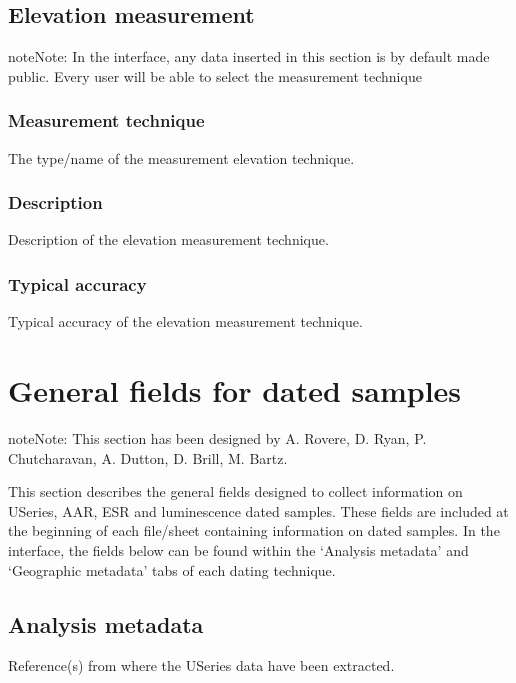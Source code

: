 \documentclass[letterpaper,10pt,english]{sphinxmanual}
\begin{document}
\section{Elevation measurement}
\label{\detokenize{Metadata:elevation-measurement}}
\begin{sphinxadmonition}{note}{Note:}
In the interface, any data inserted in this section is by default made public. Every user will be able to select the measurement technique
\end{sphinxadmonition}


\subsection{Measurement technique}
\label{\detokenize{Metadata:measurement-technique}}
The type/name of the measurement elevation technique.


\subsection{Description}
\label{\detokenize{Metadata:id2}}
Description of the elevation measurement technique.


\subsection{Typical accuracy}
\label{\detokenize{Metadata:id3}}
Typical accuracy of the elevation measurement technique.


\chapter{General fields for dated samples}
\label{\detokenize{Dated_samples:general-fields-for-dated-samples}}\label{\detokenize{Dated_samples::doc}}
\begin{sphinxadmonition}{note}{Note:}
This section has been designed by A. Rovere, D. Ryan, P. Chutcharavan, A. Dutton, D. Brill, M. Bartz.
\end{sphinxadmonition}

This section describes the general fields designed to collect information on U\sphinxhyphen{}Series, AAR, ESR and luminescence dated samples. These fields are included at the beginning of each file/sheet containing information on dated samples. In the interface, the fields below can be found within the ‘Analysis metadata’ and ‘Geographic metadata’ tabs of each dating technique.


\section{Analysis metadata}
\label{\detokenize{Dated_samples:analysis-metadata}}
 \sphinxhyphen{} Reference(s) from where the U\sphinxhyphen{}Series data have been extracted.
\end{document}
